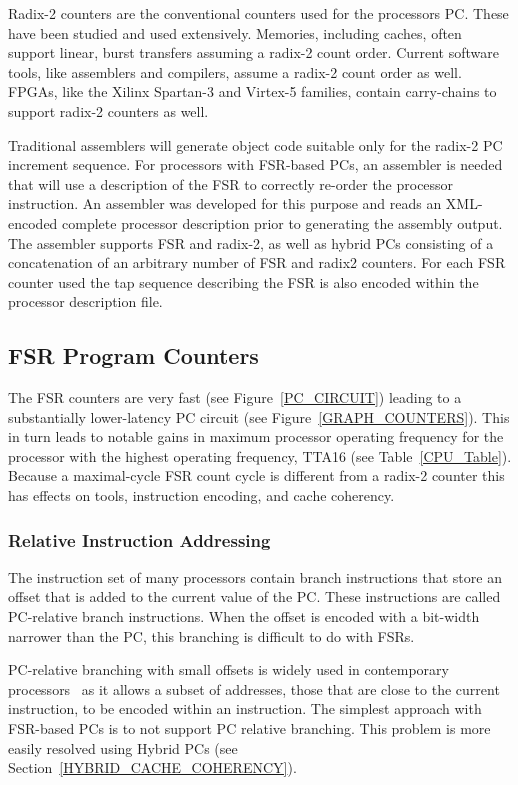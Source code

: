 \documentclass[5p, twocolumn]{elsarticle}
\begin{document}
Radix-2 counters are the conventional counters used for the processors PC. These
have been studied and used extensively. Memories, including caches, often support
linear, burst transfers assuming a radix-2 count order. Current software tools,
like assemblers and compilers, assume a radix-2 count order as well. FPGAs, like
the Xilinx Spartan-3 and Virtex-5 families, contain carry-chains to support
radix-2 counters as well.

Traditional assemblers will generate object code suitable only for the radix-2 PC
increment sequence. For processors with FSR-based PCs, an assembler is needed
that will use a description of the FSR to correctly re-order the processor
instruction. An assembler was developed for this purpose and reads an XML-encoded
complete processor description prior to generating the assembly output. The
assembler supports FSR and radix-2, as well as hybrid PCs consisting of a
concatenation of an arbitrary number of FSR and radix2 counters. For each FSR
counter used the tap sequence describing the FSR is also encoded within the
processor description file.


\subsection{FSR Program Counters}

The FSR counters are very fast (see Figure~\ref{PC_CIRCUIT}) leading to a
substantially lower-latency PC circuit (see Figure~\ref{GRAPH_COUNTERS}). This in
turn leads to notable gains in maximum processor operating frequency for the
processor with the highest operating frequency, TTA16 (see
Table~\ref{CPU_Table}). Because a maximal-cycle FSR count cycle is different from
a radix-2 counter this has effects on tools, instruction encoding, and cache
coherency.


\subsubsection{Relative Instruction Addressing}

The instruction set of many processors contain branch instructions that store an
offset that is added to the current value of the PC.  These instructions are
called PC-relative branch instructions. When the offset is encoded with a
bit-width narrower than the PC, this branching is difficult to do with FSRs.

PC-relative branching with small offsets is widely used in contemporary
processors~\cite{parhami2005cam} as it allows a subset of addresses, those that
are close to the current instruction, to be encoded within an instruction. The
simplest approach with FSR-based PCs is to not support PC relative branching.
This problem is more easily resolved using Hybrid PCs (see
Section~\ref{HYBRID_CACHE_COHERENCY}).
\end{document}
